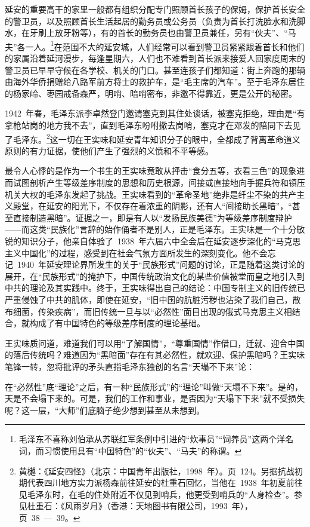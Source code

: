 延安的重要高干的家里一般都有组织分配专门照顾首长孩子的保姆，保护首长安全的警卫员，以及照顾首长生活起居的勤务员或公务员（负责为首长打洗脸水和洗脚水，在牙刷上放牙粉等），有的首长的勤务员也由警卫员兼任，另有“伙夫”、“马夫”各一人。\footnote{毛泽东不喜称刘伯承从苏联红军条例中引进的“炊事员”“饲养员”这两个洋名词，而习惯使用具有“中国特色”的“伙夫”、“马夫”的称谓。}在范围不大的延安城，人们经常可以看到警卫员紧紧跟着首长和他们的家属沿着延河漫步，每逢星期六，人们也不难看到首长派来接爱人回家度周末的警卫员已早早守候在各学校、机关的门口。甚至连孩子们都知道：街上奔跑的那辆由海外华侨捐赠给八路军前方将士的救护车，是“毛主席的汽车”。至于毛泽东居住的杨家岭、枣园戒备森严，明哨、暗哨密布，非邀不得靠近，更是公开的秘密。

1942~年春，毛泽东派李卓然登门邀请塞克到其住处谈话，被塞克拒绝，理由是“有拿枪站岗的地方我不去”，直到毛泽东吩咐撤去岗哨，塞克才在邓发的陪同下去见了毛泽东。\footnote{黄樾：《延安四怪》（北京：中国青年出版社，1998~年）。页~124。另据抗战初期代表四川地方实力派杨森前往延安的杜重石回忆，当他在~1938~年初夏前往见毛泽东时，在毛的住处附近不仅见到哨兵，他更受到哨兵的“人身检查”。参见杜重石：《风雨岁月》（香港：天地图书有限公司，1993~年），页~38~—~39。}这一切在王实味和延安青年知识分子的眼中，全都成了背离革命道义原则的有力证据，使他们产生了强烈的义愤和不平等感。

最令人心悸的是作为一个书生的王实味竟敢从抨击“食分五等，衣看三色”的现象进而试图剖析产生等级差序制度的思想和历史根源，间接或直接地向手握兵符和镇压机关大权的毛泽东发起了挑战。王实味看到的“革命圣地”绝非是纤尘不染的共产主义殿堂，在延安的阳光下，不仅存在着浓重的阴影，还有人“间接助长黑暗”，“甚至直接制造黑暗”。证据之一，即是有人以“发扬民族美德”为等级差序制度辩护——而这类“民族化”言辞的始作俑者不是别人，正是毛泽东。王实味是一个十分敏锐的知识分子，他亲自体验了~1938~年六届六中全会后在延安逐步深化的“马克思主义中国化”的过程，感受到在社会气氛方面所发生的深刻变化。他不会忘记~1940~年延安理论界所发生的关于“民族形式”问题的讨论，正是随着这类讨论的展开，在“民族形式”的掩护下，中国传统政治文化的某些价值被堂而皇之地引入到中共的理论及其实践中。终于，王实味得出自己的结论：中国专制主义的旧传统已严重侵蚀了中共的肌体，即使在延安，“旧中国的肮脏污秽也沾染了我们自己，散布细菌，传染疾病”，而旧传统一旦与以“必然性”面目出现的俄式马克思主义相结合，就构成了有中国特色的等级差序制度的理论基础。

王实味质问道，难道我们可以用“了解国情”，“尊重国情”作借口，迁就、迎合中国的落后传统吗？难道因为“黑暗面”存在有其必然性，就欢迎、保护黑暗吗？王实味笔锋一转，忽将批评的矛头直指毛泽东独创的名言“天塌不下来”论：

\begin{quoting}
在“必然性”底“理论”之后，有一种“民族形式”的“理论”叫做“天塌不下来”。是的，天是不会塌下来的。可是，我们的工作和事业，是否因为“天塌下下来”就不受损失呢？这一层，“大师”们底脑子绝少想到甚至从未想到。
\end{quoting}

